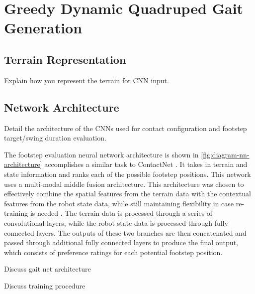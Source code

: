 \section{Greedy Dynamic Quadruped Gait Generation}

\subsection{Terrain Representation}

\begin{outline}
  Explain how you represent the terrain for CNN input.
\end{outline}



\subsection{Network Architecture}

\begin{outline}
  Detail the architecture of the CNNs used for contact configuration and footstep target/swing duration evaluation.
\end{outline}


The footstep evaluation neural network architecture is shown in \autoref{fig:diagram-nn-architecture} accomplishes a similar task to ContactNet \cite{bratta_contactnet_2024}. It takes in terrain and state information and ranks each of the possible footstep positions. This network uses a multi-modal middle fusion architecture. This architecture was chosen to effectively combine the spatial features from the terrain data with the contextual features from the robot state data, while still maintaining flexibility in case re-training is needed \cite{feng2021deep}. The terrain data is processed through a series of convolutional layers, while the robot state data is processed through fully connected layers. The outputs of these two branches are then concatenated and passed through additional fully connected layers to produce the final output, which consists of preference ratings for each potential footstep position.

\begin{todo}
  Discuss gait net architecture
\end{todo}

\begin{todo}
  Discuss training procedure
\end{todo}

